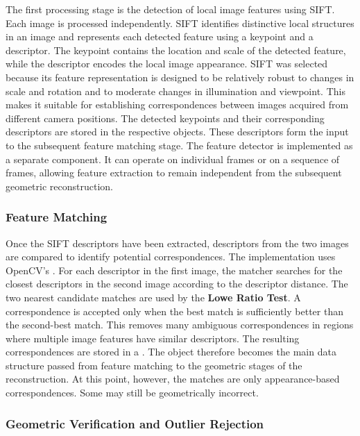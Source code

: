 The first processing stage is the detection of local image features using
SIFT. Each image is processed independently. SIFT identifies distinctive local structures in an image and represents each
detected feature using a keypoint and a descriptor. The keypoint contains the
location and scale of the detected feature, while the descriptor encodes the
local image appearance. SIFT was selected because its feature representation is designed to be
relatively robust to changes in scale and rotation and to moderate changes
in illumination and viewpoint. This makes it suitable for establishing
correspondences between images acquired from different camera positions.
The detected keypoints and their corresponding descriptors are stored in the
respective  objects. These descriptors form the input to the
subsequent feature matching stage.
The feature detector is implemented as a separate
 component. It can operate on individual frames or on
a sequence of frames, allowing feature extraction to remain independent from
the subsequent geometric reconstruction.

\subsubsection{Feature Matching}

Once the SIFT descriptors have been extracted, descriptors from the two
images are compared to identify potential correspondences.
The implementation uses OpenCV's . For each descriptor in
the first image, the matcher searches for the closest descriptors in the
second image according to the descriptor distance.
The two nearest candidate matches are used by the \textbf{Lowe Ratio Test}.
A correspondence is accepted only when the best match is sufficiently better
than the second-best match. This removes many ambiguous correspondences in
regions where multiple image features have similar descriptors.
The resulting correspondences are stored in a . The object
therefore becomes the main data structure passed from feature matching to the
geometric stages of the reconstruction.
At this point, however, the matches are only appearance-based
correspondences. Some may still be geometrically incorrect.

\subsubsection{Geometric Verification and Outlier Rejection}

